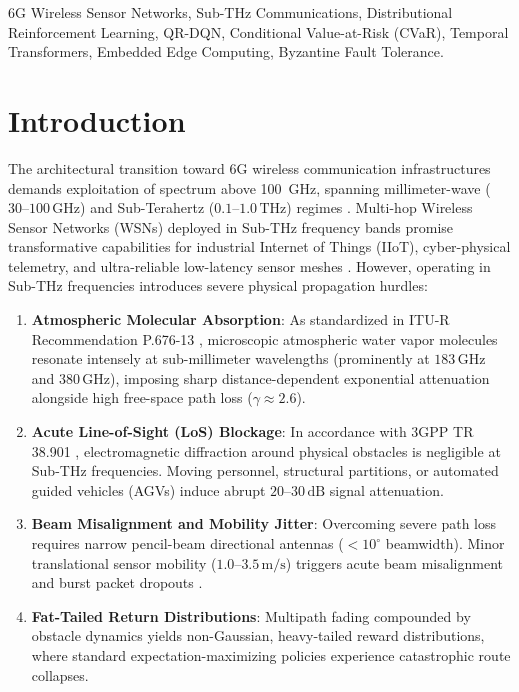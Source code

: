 \documentclass[conference]{IEEEtran}
\begin{document}
\begin{abstract}
and an edge memory footprint of $168.2\,\text{KB}$ in SRAM, verifying real-time embedded feasibility on ARM Cortex-M7 microcontrollers.
\end{abstract}

\begin{IEEEkeywords}
6G Wireless Sensor Networks, Sub-THz Communications, Distributional Reinforcement Learning, QR-DQN, Conditional Value-at-Risk (CVaR), Temporal Transformers, Embedded Edge Computing, Byzantine Fault Tolerance.
\end{IEEEkeywords}

\section{Introduction}
The architectural transition toward 6G wireless communication infrastructures demands exploitation of spectrum above 100~GHz, spanning millimeter-wave ($30\text{--}100\,\text{GHz}$) and Sub-Terahertz ($0.1\text{--}1.0\,\text{THz}$) regimes \cite{rappaport2019wireless}. Multi-hop Wireless Sensor Networks (WSNs) deployed in Sub-THz frequency bands promise transformative capabilities for industrial Internet of Things (IIoT), cyber-physical telemetry, and ultra-reliable low-latency sensor meshes \cite{jornet2011channel, zhang2024distributional}. However, operating in Sub-THz frequencies introduces severe physical propagation hurdles:
\begin{enumerate}
    \item \textbf{Atmospheric Molecular Absorption}: As standardized in ITU-R Recommendation P.676-13 \cite{itur2022p676}, microscopic atmospheric water vapor molecules resonate intensely at sub-millimeter wavelengths (prominently at $183\,\text{GHz}$ and $380\,\text{GHz}$), imposing sharp distance-dependent exponential attenuation alongside high free-space path loss ($\gamma \approx 2.6$).
    \item \textbf{Acute Line-of-Sight (LoS) Blockage}: In accordance with 3GPP TR 38.901 \cite{3gpp2022tr38901}, electromagnetic diffraction around physical obstacles is negligible at Sub-THz frequencies. Moving personnel, structural partitions, or automated guided vehicles (AGVs) induce abrupt $20\text{--}30\,\text{dB}$ signal attenuation.
    \item \textbf{Beam Misalignment and Mobility Jitter}: Overcoming severe path loss requires narrow pencil-beam directional antennas ($<10^\circ$ beamwidth). Minor translational sensor mobility ($1.0\text{--}3.5\,\text{m/s}$) triggers acute beam misalignment and burst packet dropouts \cite{liu2025riskaware}.
    \item \textbf{Fat-Tailed Return Distributions}: Multipath fading compounded by obstacle dynamics yields non-Gaussian, heavy-tailed reward distributions, where standard expectation-maximizing policies experience catastrophic route collapses.
\end{enumerate}
\end{document}

